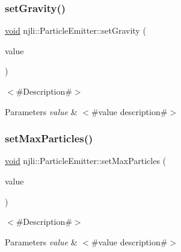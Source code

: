 \subsubsection{\texorpdfstring{set\+Gravity()}{setGravity()}}
{\footnotesize\ttfamily \mbox{\hyperlink{_thread_8h_af1e856da2e658414cb2456cb6f7ebc66}{void}} njli\+::\+Particle\+Emitter\+::set\+Gravity (\begin{DoxyParamCaption}\item[{const bt\+Vector3 \&}]{value }\end{DoxyParamCaption})}

$<$\#\+Description\#$>$


\begin{DoxyParams}{Parameters}
{\em value} & $<$\#value description\#$>$ \\
\hline
\end{DoxyParams}
\mbox{\label{classnjli_1_1_particle_emitter_a5029ab3ba29b3f6e52059c12ca40ebdf}} 
\subsubsection{\texorpdfstring{set\+Max\+Particles()}{setMaxParticles()}}
{\footnotesize\ttfamily \mbox{\hyperlink{_thread_8h_af1e856da2e658414cb2456cb6f7ebc66}{void}} njli\+::\+Particle\+Emitter\+::set\+Max\+Particles (\begin{DoxyParamCaption}\item[{const \mbox{\hyperlink{_util_8h_a10e94b422ef0c20dcdec20d31a1f5049}{u32}} \&}]{value }\end{DoxyParamCaption})}

$<$\#\+Description\#$>$


\begin{DoxyParams}{Parameters}
{\em value} & $<$\#value description\#$>$ \\
\hline
\end{DoxyParams}
\mbox{\label{classnjli_1_1_particle_emitter_af5c7ab6d53dfb95e9d40ebfa0200a5a5}} 
